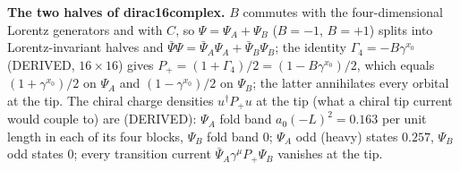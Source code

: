 \documentclass[
  10pt,
]{article}
\begin{document}
\textbf{The two halves of dirac16complex.} \(B\) commutes with the
four-dimensional Lorentz generators and with \(C\), so
\(\Psi = \Psi_A + \Psi_B\) (\(B = -1\), \(B = +1\)) splits into
Lorentz-invariant halves and
\(\bar\Psi\Psi = \bar\Psi_A\Psi_A + \bar\Psi_B\Psi_B\); the identity
\(\Gamma_4 = -B\gamma^{x_0}\) (DERIVED, \(16\times16\)) gives
\(P_+ = (1 + \Gamma_4)/2 = (1 - B\gamma^{x_0})/2\), which equals
\((1 + \gamma^{x_0})/2\) on \(\Psi_A\) and \((1 - \gamma^{x_0})/2\) on
\(\Psi_B\); the latter annihilates every orbital at the tip. The chiral
charge densities \(u^\dagger P_+u\) at the tip (what a chiral tip
current would couple to) are (DERIVED): \(\Psi_A\) fold band
\(a_0(-L)^2 = 0.163\) per unit length in each of its four blocks,
\(\Psi_B\) fold band \(0\); \(\Psi_A\) odd (heavy) states \(0.257\),
\(\Psi_B\) odd states \(0\); every transition current
\(\bar\Psi_A\gamma^\mu P_+\Psi_B\) vanishes at the tip.
\end{document}
